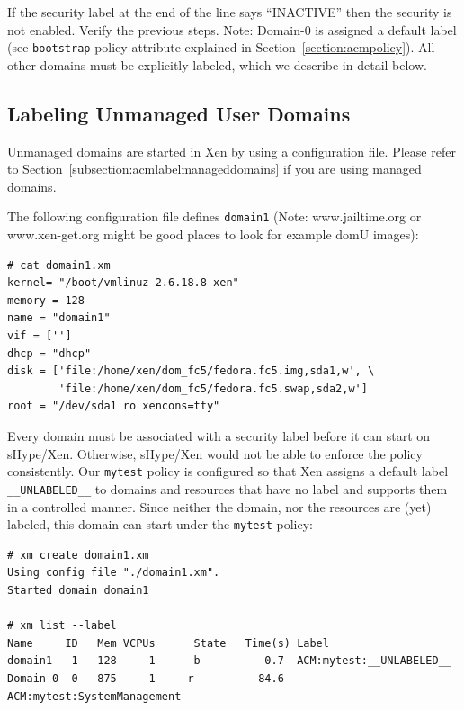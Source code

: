 \documentclass[11pt,twoside,final,openright]{report}
\begin{document}
If the security label at the end of the line says ``INACTIVE'' then the
security is not enabled. Verify the previous steps. Note: Domain-0 is
assigned a default label (see \verb|bootstrap| policy attribute
explained in Section~\ref{section:acmpolicy}). All other domains must
be explicitly labeled, which we describe in detail below.

\subsection{Labeling Unmanaged User Domains}
\label{subsection:acmexamplelabeldomains}

Unmanaged domains are started in Xen by using a configuration
file. Please refer to Section~\ref{subsection:acmlabelmanageddomains}
if you are using managed domains.

The following configuration file defines \verb|domain1|
(Note: www.jailtime.org or www.xen-get.org might be good
places to look for example domU images):

\begin{scriptsize}
\begin{verbatim}
# cat domain1.xm
kernel= "/boot/vmlinuz-2.6.18.8-xen"
memory = 128
name = "domain1"
vif = ['']
dhcp = "dhcp"
disk = ['file:/home/xen/dom_fc5/fedora.fc5.img,sda1,w', \
        'file:/home/xen/dom_fc5/fedora.fc5.swap,sda2,w']
root = "/dev/sda1 ro xencons=tty"
\end{verbatim}
\end{scriptsize}

Every domain must be associated with a security label before it can start
on sHype/Xen. Otherwise, sHype/Xen would not be able to enforce the policy
consistently. Our \verb|mytest| policy is configured so that Xen
assigns a default label \verb|__UNLABELED__| to domains and resources that
have no label and supports them in a controlled manner. Since neither the domain,
nor the resources are (yet) labeled, this domain can start under the \verb|mytest|
policy:

\begin{scriptsize}
\begin{verbatim}
# xm create domain1.xm
Using config file "./domain1.xm".
Started domain domain1

# xm list --label
Name     ID   Mem VCPUs      State   Time(s) Label
domain1   1   128     1     -b----      0.7  ACM:mytest:__UNLABELED__
Domain-0  0   875     1     r-----     84.6  ACM:mytest:SystemManagement
\end{verbatim}
\end{scriptsize}
\end{document}
